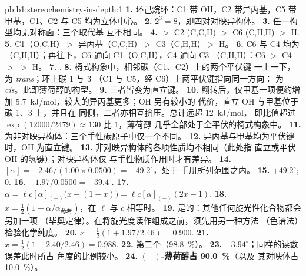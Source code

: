 \begin{solution}{pb:b1:stereochemistry-in-depth:1}
\textbf{1.} 环己烷环：C1 带 OH，C2 带异丙基，C5 带
甲基，C1、C2 与 C5 均为立体中心。
\textbf{2.} $2^3 = 8$，即四对对映异构体。
\textbf{3.} 任一构型均无对称面：三个取代基
互不相同。
\textbf{4.}  $>$ C2 (C,C,H) $>$ C6 (C,H,H) $>$ H.
\textbf{5.} C1（O,C,H）$>$ 异丙基（C,C,H）$>$ C3（C,H,H）$>$ H。
\textbf{6.} C6 与 C4 均为（C,H,H）；再往下，C6 通向 C1（O,C,H），C4 通向 C3
（C,H,H）：C6 $>$ C4 $>$  $>$ H。
\textbf{7.} .
\textbf{8.} 椅式构象中，相邻碳（C1、C2）上的两个平伏键
一上一下，为 \textit{trans}；环上碳 1 与 3
（C1 与 C5，经 C6）上两平伏键指向同一方向：
为 \textit{cis}。此即薄荷醇的构型。
\textbf{9.} 三者皆变为直立键。
\textbf{10.} 翻转后，仅甲基一项便约增加
\qty{5.7}{kJ/mol}，较大的异丙基更多；OH 另有较小的
代价，直立 OH 与甲基位于碳 1、3 上，并且在
同侧，二者亦相互挤压。总计远超 \qty{12}{kJ/mol}，
即比值超过 $\exp(12000/2479) \approx 130$ 比 1，薄荷醇
几乎全部处于全平伏的椅式构象中。
\textbf{11.} 为非对映异构体：三个手性碳原子中仅一个不同。
\textbf{12.} 异丙基与甲基均为平伏键时，OH 为直立键。
\textbf{13.} 非对映异构体的各项性质均不相同（此处指
直立或平伏 OH 的氢键）；对映异构体仅
与手性物质作用时才有差异。
\textbf{14.} $[\alpha] = -2.46/(1.00 \times 0.0500) = -49.2^\circ$，处于
手册所列范围之内。
\textbf{15.} $+49.2^\circ$; $0$.
\textbf{16.} $-1.97/0.0500 = -39.4^\circ$.
\textbf{17.} $\alpha = \ell c[\alpha]_{(-)}\bigl(x - (1 - x)\bigr) =
\ell c[\alpha]_{(-)}(2x - 1)$.
\textbf{18.} $x = \frac12(1 + \alpha/\alpha_{\text{参考}})$，在 $\ell$ 与 $c$ 相等时。
\textbf{19.} 是的：其他任何旋光性化合物都会另加一项
（毕奥定律）。在将旋光度读作组成之前，须先用另一种方法
（色谱法）检验化学纯度。
\textbf{20.} $x = \frac12(1 + 1.97/2.46) = 0.900$.
\textbf{21.} $x = \frac12(1 + 2.40/2.46) = 0.988$.
\textbf{22.} 第二个（\qty{98.8}{\percent}）。
\textbf{23.} $-3.94^\circ$；同样的读数误差此时所占
角度的比例较小。
\textbf{24.} \textbf{$(-)$-薄荷醇占 \qty{90.0}{\percent}}（以及
其对映体占 \qty{10.0}{\percent}）。
\end{solution}
